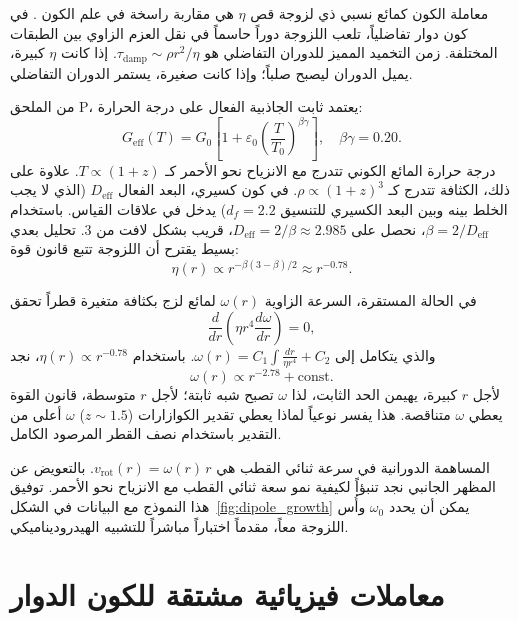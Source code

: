 \documentclass[12pt,a4paper]{article}
\begin{document}
	معاملة الكون كمائع نسبي ذي لزوجة قص \(\eta\) هي مقاربة راسخة في علم الكون \cite{Giovannini2005}. في كون دوار تفاضلياً، تلعب اللزوجة دوراً حاسماً في نقل العزم الزاوي بين الطبقات المختلفة. زمن التخميد المميز للدوران التفاضلي هو \(\tau_{\mathrm{damp}} \sim \rho r^2 / \eta\). إذا كانت \(\eta\) كبيرة، يميل الدوران ليصبح صلباً؛ وإذا كانت صغيرة، يستمر الدوران التفاضلي.
	
	من الملحق P، يعتمد ثابت الجاذبية الفعال على درجة الحرارة:
	\begin{equation}
		G_{\mathrm{eff}}(T) = G_0\left[1 + \varepsilon_0\left(\frac{T}{T_0}\right)^{\beta\gamma}\right], \quad \beta\gamma = 0.20.
	\end{equation}
	درجة حرارة المائع الكوني تتدرج مع الانزياح نحو الأحمر كـ \(T \propto (1+z)\). علاوة على ذلك، الكثافة تتدرج كـ \(\rho \propto (1+z)^3\). في كون كسيري، البعد الفعال \(D_{\mathrm{eff}}\) (الذي لا يجب الخلط بينه وبين البعد الكسيري للتنسيق \(d_f = 2.2\)) يدخل في علاقات القياس. باستخدام \(\beta = 2/D_{\mathrm{eff}}\)، نحصل على \(D_{\mathrm{eff}} = 2/\beta \approx 2.985\)، قريب بشكل لافت من 3. تحليل بعدي بسيط يقترح أن اللزوجة تتبع قانون قوة:
	\begin{equation}
		\eta(r) \propto r^{-\beta(3-\beta)/2} \approx r^{-0.78}.
	\end{equation}
	
	في الحالة المستقرة، السرعة الزاوية \(\omega(r)\) لمائع لزج بكثافة متغيرة قطراً تحقق
	\begin{equation}
		\frac{d}{dr}\left( \eta r^4 \frac{d\omega}{dr} \right) = 0,
	\end{equation}
	والذي يتكامل إلى \(\omega(r) = C_1 \int \frac{dr}{\eta r^4} + C_2\). باستخدام \(\eta(r) \propto r^{-0.78}\)، نجد
	\begin{equation}
		\omega(r) \propto r^{-2.78} + \text{const}.
	\end{equation}
	لأجل \(r\) كبيرة، يهيمن الحد الثابت، لذا \(\omega\) تصبح شبه ثابتة؛ لأجل \(r\) متوسطة، قانون القوة يعطي \(\omega\) متناقصة. هذا يفسر نوعياً لماذا يعطي تقدير الكوازارات (\(z\sim1.5\)) \(\omega\) أعلى من التقدير باستخدام نصف القطر المرصود الكامل.
	
	المساهمة الدورانية في سرعة ثنائي القطب هي \(v_{\mathrm{rot}}(r) = \omega(r) \, r\). بالتعويض عن المظهر الجانبي نجد تنبؤاً لكيفية نمو سعة ثنائي القطب مع الانزياح نحو الأحمر. توفيق هذا النموذج مع البيانات في الشكل~\ref{fig:dipole_growth} يمكن أن يحدد \(\omega_0\) وأُس اللزوجة معاً، مقدماً اختباراً مباشراً للتشبيه الهيدروديناميكي.
	
	\section{معاملات فيزيائية مشتقة للكون الدوار}
	
\end{document}
